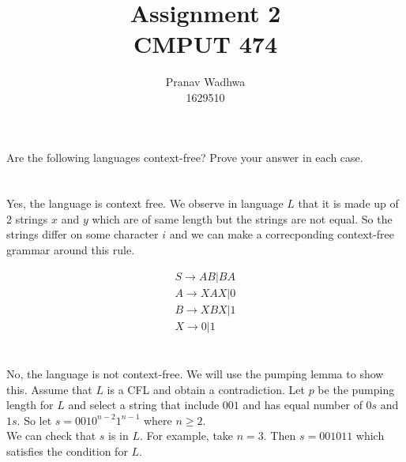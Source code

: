 \documentclass[12pt]{exam}
\title{
  Assignment 2\\
  \large CMPUT 474
}
\author{Pranav Wadhwa\\1629510}
\begin{document}
\maketitle
\noindent

\begin{questions}

  \question{} Are the following languages context-free? Prove your answer in each case.

    \begin{solution}

      \begin{parts}
        \part{}

      Yes, the language is context free. We observe in language $L$ that it is made up of 2 strings $x$ and $y$ which are of same length but the strings are not equal. So the strings differ on some character $i$ and we can make a correcponding context-free grammar around this rule.

      \begin{gather*}
        S\to AB|BA\\
        A\to XAX|0\\
        B\to XBX|1\\
        X\to 0|1
      \end{gather*}

      \part{}
      No, the language is not context-free. We will use the pumping lemma to show this.
      Assume that $L$ is a CFL and obtain a contradiction. Let $p$ be the pumping length for $L$ and select a string that include $001$ and has equal number of $0s$ and $1s$. So let $s = 0010^{n-2}1^{n-1}$ where $n \ge 2$.\\
      We can check that $s$ is in $L$. For example, take $n = 3$. Then $s = 001011$ which satisfies the condition for $L$.


\end{parts}
\end{solution}
\end{questions}
\end{document}

